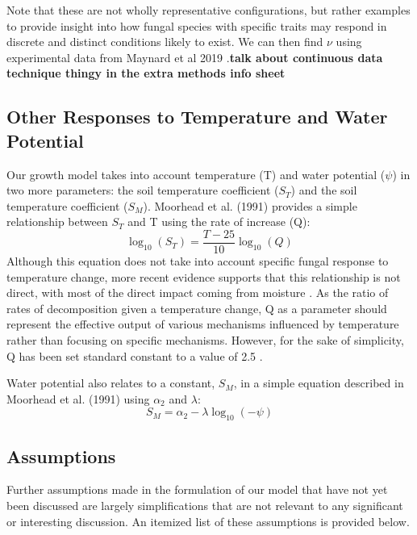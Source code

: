 \documentclass[12pt]{article}
\begin{document}
Note that these are not wholly representative configurations, but rather examples to provide insight into how fungal species with specific traits may respond in discrete and distinct conditions likely to exist. We can then find $\nu$ using experimental data from Maynard et al 2019 \cite{Maynard2019}.\textbf{talk about continuous data technique thingy in the extra methods info sheet}

\begin{multicols}{2}	
\subsection{Other Responses to Temperature and Water Potential}\label{Other Responses to Temperature and Water Potential}

Our growth model takes into account temperature (T) and water potential ($\psi$) in two more parameters: the soil temperature coefficient ($S_T$) and the soil temperature coefficient ($S_M$). Moorhead et al. (1991) provides a simple relationship between $S_T$ and T using the rate of increase (Q):
\begin{equation}
\log_{10}(S_T) = \frac{T-25}{10}\log_{10}(Q)
\end{equation}
Although this equation does not take into account specific fungal response to temperature change, more recent evidence supports that this relationship is not direct, with most of the direct impact coming from moisture \cite{Petraglia2019}. As the ratio of rates of decomposition given a temperature change, Q as a parameter should represent the effective output of various mechanisms influenced by temperature rather than focusing on specific mechanisms. However, for the sake of simplicity, Q has been set standard constant to a value of 2.5 \cite{Moorhead1991}.

Water potential also relates to a constant, $S_M$, in a simple equation described in Moorhead et al. (1991) using $\alpha_2$ and $\lambda$:
\begin{equation}
S_M = \alpha_2 -\lambda \log_{10}(-\psi)
\end{equation}

\subsection{Assumptions}

Further assumptions made in the formulation of our model that have not yet been discussed are largely simplifications that are not relevant to any significant or interesting discussion. An itemized list of these assumptions is provided below.

\end{multicols}
\end{document}
